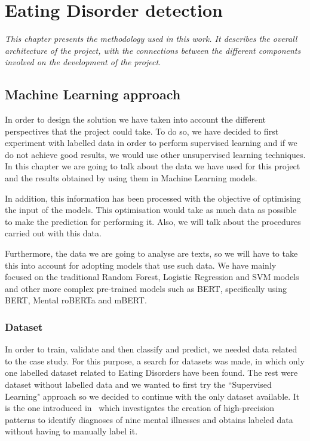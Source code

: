 \chapter{Eating Disorder detection}
\label{chap:architecture}
\textit{This chapter presents the methodology used in this work. It describes the overall architecture of the project, with the connections between the different components involved on the development of the project.}

\clearpage
\section{Machine Learning approach}
In order to design the solution we have taken into account the different perspectives that the project could take. To do so, we have decided to first experiment with labelled data in order to perform supervised learning and if we do not achieve good results, we would use other unsupervised learning techniques. In this chapter we are going to talk about the data we have used for this project and the results obtained by using them in Machine Learning models.

In addition, this information has been processed with the objective of optimising the input of the models. This optimisation would take as much data as possible to make the prediction for performing it. Also, we will talk about the procedures carried out with this data.

Furthermore, the data we are going to analyse are texts, so we will have to take this into account for adopting models that use such data. We have mainly focused on the traditional Random Forest, Logistic Regression and SVM models and other more complex pre-trained models such as BERT, specifically using BERT, Mental roBERTa and mBERT.


\subsection{Dataset}
\label{sec:dataset}
In order to train, validate and then classify and predict, we needed data related to the case study. For this purpose, a search for datasets was made, in which only one labelled dataset related to Eating Disorders have been found. The rest were dataset without labelled data and we wanted to first try the ``Supervised Learning" approach so we decided to continue with the only dataset available. It is the one introduced in~\cite{https://doi.org/10.48550/arxiv.1806.05258} which investigates the creation of high-precision patterns to identify diagnoses of nine mental illnesses and obtains labeled data without having to manually label it.

